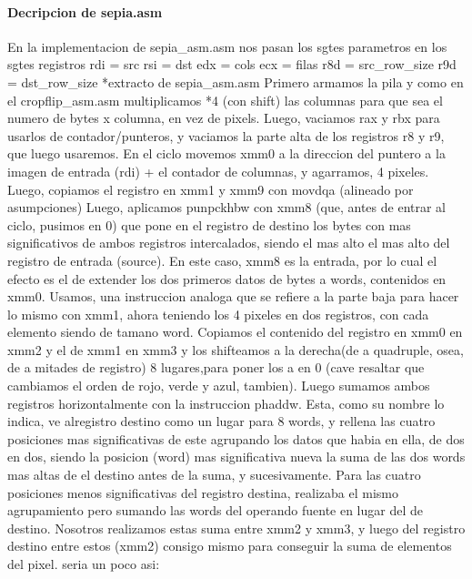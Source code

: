 \documentclass[a4paper]{article}
\begin{document}
 	 
\paragraph{\textbf{Decripcion de sepia.asm}}
\hfill \break
	En la implementacion de sepia_asm.asm nos pasan los sgtes parametros en los sgtes registros
\hfill \break
	rdi = src
	\hfill \break
    rsi = dst
    \hfill \break
    edx = cols
    \hfill \break
    ecx = filas
    \hfill \break
    r8d = src_row_size
    \hfill \break    
    r9d = dst_row_size
    \hfill \break
 *extracto de sepia_asm.asm
  \hfill \break
  Primero armamos la pila y como en el cropflip_asm.asm multiplicamos  *4 (con shift) las columnas para que sea el numero de bytes x columna, en vez de pixels.
  Luego, vaciamos rax y rbx para usarlos de contador/punteros, y vaciamos la parte alta de los registros r8 y r9, que luego usaremos. 
  \hfill \break
   En el ciclo movemos xmm0 a la direccion del puntero a la imagen de entrada (rdi) + el contador de columnas, y agarramos, 4 pixeles. Luego, copiamos el registro en xmm1 y xmm9 con movdqa (alineado por asumpciones)
   \hfill \break
   Luego, aplicamos punpckhbw con xmm8 (que, antes de entrar al ciclo, pusimos en 0) que pone en el registro de destino los bytes con mas significativos de ambos registros intercalados, siendo el mas alto el mas alto del registro de entrada (source). En este caso, xmm8 es la entrada, por lo cual el efecto es el de extender los dos primeros datos de bytes a words, contenidos en xmm0. Usamos, una instruccion analoga que se refiere a la parte baja para hacer lo mismo con xmm1, ahora teniendo los 4 pixeles en dos registros, con cada elemento siendo de tamano word.
   \hfill \break
   Copiamos el contenido del registro en  xmm0 en xmm2 y el de xmm1 en xmm3 y los shifteamos a la derecha(de a quadruple, osea, de a mitades de registro) 8 lugares,para poner los a en 0 (cave resaltar que cambiamos el orden de rojo, verde y azul, tambien).
   \hfill \break
   Luego sumamos ambos registros horizontalmente con la instruccion phaddw. Esta, como su nombre lo indica, ve alregistro destino como un lugar para 8 words, y rellena las cuatro posiciones mas significativas de este agrupando los datos que habia en ella, de dos en dos, siendo la posicion (word)  mas significativa nueva la suma de las dos words mas altas de el destino antes de la suma, y sucesivamente. Para las cuatro posiciones menos significativas del registro destina,  realizaba el mismo agrupamiento pero sumando las words del operando fuente en lugar del de destino. Nosotros realizamos estas suma entre xmm2 y xmm3, y luego del registro destino entre estos (xmm2) consigo mismo para conseguir la suma de elementos del pixel. seria un poco asi:
   \hfill \break
   
\end{document}
